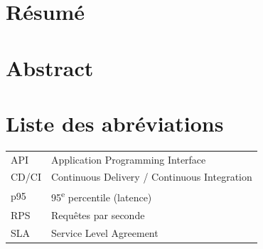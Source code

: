 \documentclass[a4paper,12pt,twoside]{report}
\begin{document}
\chapter*{Résumé}


\chapter*{Abstract}


\tableofcontents
\listoffigures
\listoftables
\newpage

\chapter*{Liste des abréviations}
\begin{tabular}{@{}ll@{}}
API & Application Programming Interface\\
CD/CI & Continuous Delivery / Continuous Integration\\
p95 & 95\textsuperscript{e} percentile (latence)\\
RPS & Requêtes par seconde\\
SLA & Service Level Agreement\\
\end{tabular}
\newpage

















\end{document}
